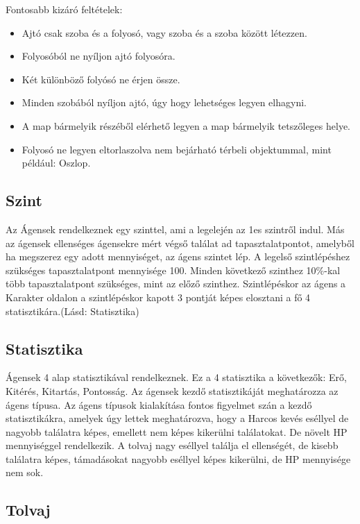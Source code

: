 \noindent Fontosabb kizáró feltételek:

\begin{itemize}
    \item Ajtó csak szoba és a folyosó, vagy szoba és a szoba között létezzen.
    \item Folyosóból ne nyíljon ajtó folyosóra.
    \item Két különböző folyósó ne érjen össze.
    \item Minden szobából nyíljon ajtó, úgy hogy lehetséges legyen elhagyni.
    \item A map bármelyik részéből elérhető legyen a map bármelyik tetszőleges helye.
    \item Folyosó ne legyen eltorlaszolva nem bejárható térbeli objektummal, mint például: Oszlop.
\end{itemize}


\subsection{Szint}

Az Ágensek rendelkeznek egy szinttel, ami a legelején az 1es szintről indul.
Más az ágensek ellenséges ágensekre mért végső találat ad tapasztalatpontot, amelyből ha megszerez egy adott mennyiséget, az ágens szintet lép.
A legelső szintlépéshez szükséges tapasztalatpont mennyisége 100.
Minden következő szinthez 10\%-kal több tapasztalatpont szükséges, mint az előző szinthez.
Szintlépéskor az ágens a Karakter oldalon a szintlépéskor kapott 3 pontját képes elosztani a fő 4 statisztikára.(Lásd: Statisztika)

\subsection{Statisztika}

Ágensek 4 alap statisztikával rendelkeznek.
Ez a 4 statisztika a következők: Erő, Kitérés, Kitartás, Pontosság.
Az ágensek kezdő statisztikáját meghatározza az ágens típusa.
Az ágens típusok kialakítása fontos figyelmet szán a kezdő statisztikákra, amelyek úgy lettek meghatározva, hogy a Harcos kevés eséllyel de nagyobb találatra képes, emellett nem képes kikerülni találatokat. De növelt HP mennyiséggel rendelkezik.
A tolvaj nagy eséllyel találja el ellenségét, de kisebb találatra képes, támadásokat nagyobb eséllyel képes kikerülni, de HP mennyisége nem sok.

\subsection{Tolvaj}

